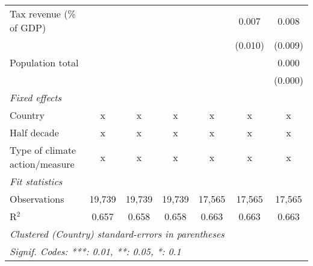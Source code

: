 \begin{tabular}{lcccccc}
   Tax revenue (\% of GDP)                                         &         &                &                &               & 0.007         & 0.008\\   
                                                                   &         &                &                &               & (0.010)       & (0.009)\\   
   Population total                                                &         &                &                &               &               & 0.000\\   
                                                                   &         &                &                &               &               & (0.000)\\   
   \emph{Fixed effects}\\
   Country                                                         & x       & x              & x              & x             & x             & x\\  
   Half decade                                                     & x       & x              & x              & x             & x             & x\\  
   Type of climate action/measure                                  & x       & x              & x              & x             & x             & x\\  
   \midrule \emph{Fit statistics}\\
   Observations                                                    & 19,739  & 19,739         & 19,739         & 17,565        & 17,565        & 17,565\\  
   R$^2$                                                           & 0.657   & 0.658          & 0.658          & 0.663         & 0.663         & 0.663\\  
   \midrule
   \multicolumn{7}{l}{\emph{Clustered (Country) standard-errors in parentheses}}\\
   \multicolumn{7}{l}{\emph{Signif. Codes: ***: 0.01, **: 0.05, *: 0.1}}\\
\end{tabular}
\par\endgroup


